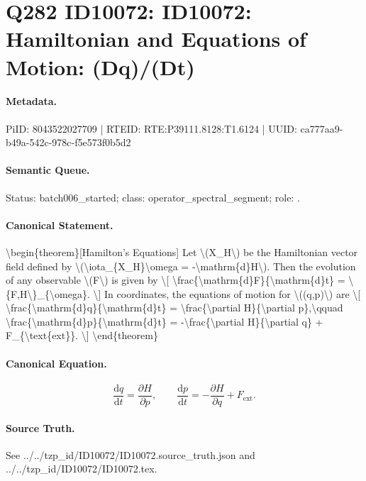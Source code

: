 \section*{Q282 ID10072: ID10072: Hamiltonian and Equations of Motion: (Dq)/(Dt)}
\paragraph{Metadata.}
PiID: 8043522027709 | RTEID: RTE:P39111.8128:T1.6124 | UUID: ca777aa9-b49a-542c-978c-f5e573f0b5d2

\paragraph{Semantic Queue.}
Status: batch006\_started; class: operator\_spectral\_segment; role: .

\paragraph{Canonical Statement.}
\textbackslash{}begin\{theorem\}[Hamilton’s Equations] Let \textbackslash{}(X\_H\textbackslash{}) be the Hamiltonian vector field defined by \textbackslash{}(\textbackslash{}iota\_\{X\_H\}\textbackslash{}omega = -\textbackslash{}mathrm\{d\}H\textbackslash{}). Then the evolution of any observable \textbackslash{}(F\textbackslash{}) is given by \textbackslash{}[ \textbackslash{}frac\{\textbackslash{}mathrm\{d\}F\}\{\textbackslash{}mathrm\{d\}t\} = \textbackslash{}\{F,H\textbackslash{}\}\_\{\textbackslash{}omega\}. \textbackslash{}] In coordinates, the equations of motion for \textbackslash{}((q,p)\textbackslash{}) are \textbackslash{}[ \textbackslash{}frac\{\textbackslash{}mathrm\{d\}q\}\{\textbackslash{}mathrm\{d\}t\} = \textbackslash{}frac\{\textbackslash{}partial H\}\{\textbackslash{}partial p\},\textbackslash{}qquad \textbackslash{}frac\{\textbackslash{}mathrm\{d\}p\}\{\textbackslash{}mathrm\{d\}t\} = -\textbackslash{}frac\{\textbackslash{}partial H\}\{\textbackslash{}partial q\} + F\_\{\textbackslash{}text\{ext\}\}. \textbackslash{}] \textbackslash{}end\{theorem\}

\paragraph{Canonical Equation.}
\[
\frac{\mathrm{d}q}{\mathrm{d}t} = \frac{\partial H}{\partial p},\qquad \frac{\mathrm{d}p}{\mathrm{d}t} = -\frac{\partial H}{\partial q} + F_{\text{ext}}.
\]

\paragraph{Source Truth.}
See ../../tzp\_id/ID10072/ID10072.source\_truth.json and ../../tzp\_id/ID10072/ID10072.tex.
